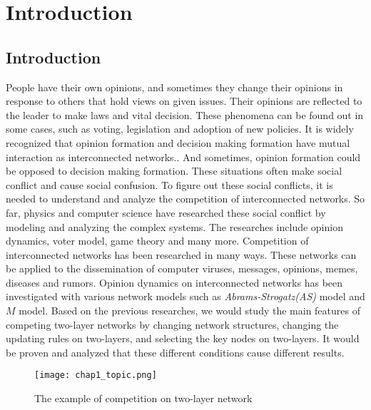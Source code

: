 
\chapter{Introduction}
\label{chap1}
\section{Introduction}
People have their own opinions, and sometimes they change their opinions in response to others that hold views on given issues. Their opinions are reflected to the leader to make laws and vital decision. These phenomena can be found out  in some cases, such as voting, legislation and adoption of new policies. It is widely recognized that opinion formation and decision making formation have mutual interaction as interconnected networks.\parencite{mikko2014, danziger2019, newman2010, boccaletti2014, domenico2013, tomasini2015, namkhanhvu2017}. And sometimes, opinion formation could be opposed to decision making formation. These situations often make social conflict and cause social confusion. To figure out these social conflicts, it is needed to understand and analyze the competition of interconnected networks. So far, physics and computer science have researched these social conflict by modeling and analyzing the complex systems\parencite{fangwu2004, zuev2012, laguna2004, masuda2014}. The researches include opinion dynamics, voter model, game theory and many more.\parencite{smyrnakis2019, bianconi2018, redner2017, haibo2017, amato2017, quattrociocchi2014, casey2009} 
Competition of interconnected networks has been researched in many ways. These networks can be applied to the dissemination of computer viruses, messages, opinions, memes, diseases and rumors\parencite{hua2014,shenyu2018, zhou2018, alvarez2016,gomez2015,diep2017,rocca2014,velasquez2018}. Opinion dynamics on interconnected networks has been investigated with various network models such as \textit{Abrams-Strogatz(AS)} model\parencite{abrams2003,vazquez2010} and $M$ model\parencite{rocca2014}.  Based on the previous researches, we would study the main features of competing two-layer networks by changing network structures, changing the updating rules on two-layers, and selecting the key nodes on two-layers. It would be proven and analyzed that these different conditions cause different results.
\begin{figure}[!htb]
	\centering
	\texttt{[image: chap1\_topic.png]}
	\caption{The example of competition on two-layer network}
	\label{chap1_topic}
\end{figure}

